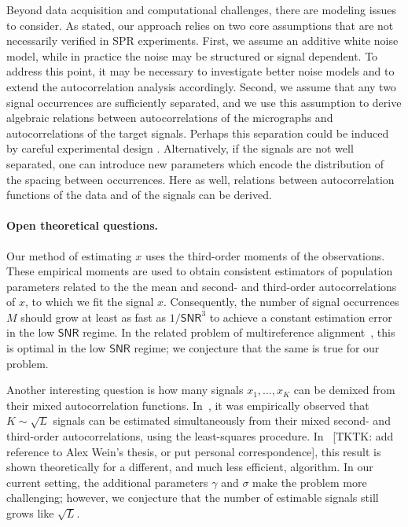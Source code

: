 \documentclass[english,11pt]{article}
\newcommand{\1}{\mathbf{1}}
\newcommand{\TODO}[1]{{\color{red}{[#1]}}}
\numberwithin{equation}{section}
\theoremstyle{plain}
\theoremstyle{definition}
\theoremstyle{remark}
\theoremstyle{plain}
\theoremstyle{remark}
\theoremstyle{plain}
\theoremstyle{plain}
\newcommand{\SNR}{\ensuremath{\textsf{SNR}}}
\begin{document}
Beyond data acquisition and computational challenges, there are modeling issues to consider.
As stated, our approach relies on two core assumptions that are not necessarily verified in SPR experiments.
First, we assume an additive white noise model, while in practice the noise may be structured or signal dependent. To address this point, it may be necessary to investigate better noise models and to extend the autocorrelation analysis accordingly.
Second, we assume that any two signal occurrences are sufficiently separated, and we use this assumption to derive algebraic relations between autocorrelations of the micrographs and autocorrelations of the target signals. 
Perhaps this separation could be induced by careful experimental design \TODO{?}.
Alternatively, if the signals are not well separated, one can introduce new parameters which encode the distribution of the spacing between occurrences. Here as well, relations between autocorrelation functions of the data and of the signals can be derived.

\TODO{Should we discuss CTF? Where, and to what extent?}

\TODO{Where and how do we cite Kam? Fred?}



\paragraph{Open theoretical questions.}

Our method of estimating $x$ uses the third-order moments of the observations. These empirical moments are used to obtain consistent estimators of population parameters related to the the mean and second- and third-order autocorrelations of $x$, to which we fit the signal $x$. Consequently, the number of signal occurrences $M$ should grow at least as fast as $1/\SNR^3$ to achieve a constant estimation error in the low $\SNR$ regime. In the related problem of multireference alignment~\cite{perry2017sample,abbe2017multireference}, this is optimal in the low $\SNR$ regime; we conjecture that the same is true for our problem.



Another interesting question is how many signals $x_1,\dots,x_K$ can be demixed from their mixed autocorrelation functions. In~\cite{boumal2017heterogeneous}, it was empirically observed that $K \sim \sqrt{L}$ signals can be estimated simultaneously from their mixed second- and third-order autocorrelations, using the least-squares procedure. In~\cite{weinthesis} [TKTK: add reference to Alex Wein's thesis, or put personal correspondence], this result is shown theoretically for a different, and much less efficient, algorithm. In our current setting, the additional parameters $\gamma$ and $\sigma$ make the problem more challenging; however, we conjecture that the number of estimable signals still grows like $\sqrt{L}$.
\end{document}
